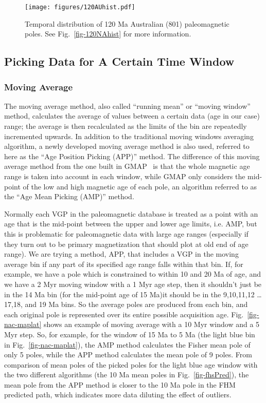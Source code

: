 \begin{figure*}
\centering
\texttt{[image: figures/120AUhist.pdf]}
\caption[Distribution of 120 Ma Australian poles]{Temporal
distribution of 120 Ma Australian (801) paleomagnetic poles. See
Fig.~\ref{fig-120NAhist} for more information.}\label{fig-120AUhist}
\end{figure*}

\subsection{Picking Data for A Certain Time Window}

\subsubsection{Moving Average}

The moving average method, also called ``running mean'' or ``moving
window''~\cite{T08} method, calculates the average of values between a certain
data (age in our case) range; the average is then recalculated as the limits of
the bin are repeatedly incremented upwards. In addition to the traditional
moving windows averaging algorithm, a newly developed moving average method is
also used, referred to here as the ``Age Position Picking (APP)'' method. The
difference of this moving average method from the one built in
GMAP~\cite{T99,T08} is that the whole magnetic age range is taken into account
in each window, while GMAP only considers the mid-point of the low and high
magnetic age of each pole, an algorithm referred to as the ``Age Mean Picking
(AMP)'' method.

Normally each VGP in the paleomagnetic database is treated as a point with an
age that is the mid-point between the upper and lower age limits, i.e. AMP, but
this is problematic for paleomagnetic data with large age ranges (especially if
they turn out to be primary magnetization that should plot at old end of age
range). We are trying a method, APP, that includes a VGP in the moving average
bin if any part of its specified age range falls within that bin. If, for
example, we have a pole which is constrained to within 10 and 20 Ma of age, and
we have a 2 Myr moving window with a 1 Myr age step, then it shouldn't just be
in the 14 Ma bin (for the mid-point age of 15 Ma)\textemdash{}it
should be in the 9,10,11,12
\ldots17,18, and 19 Ma bins. So the
average poles are produced from each bin, and each original pole is represented
over its entire possible acquisition age. Fig.~\ref{fig-nac-maplat} shows an
example of moving average with a 10 Myr window and a 5 Myr step. So, for
example, for the window of 15 Ma to 5 Ma (the light blue bin in
Fig.~\ref{fig-nac-maplat}), the AMP method calculates the Fisher mean pole of
only 5 poles, while the APP method calculates the mean pole of 9 poles. From
comparison of mean poles of the picked poles for the light blue age window with
the two different algorithms (the 10 Ma mean poles in Fig.~\ref{fig-fhsPred}),
the mean pole from the APP method is closer to the 10 Ma pole in the FHM
predicted path, which indicates more data diluting the effect of outliers.

